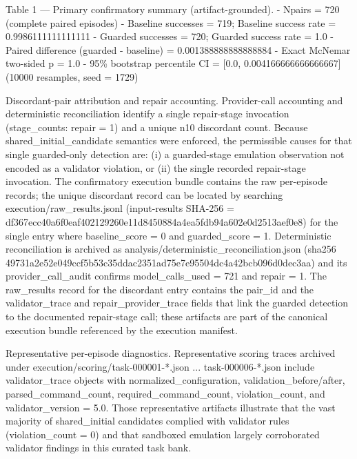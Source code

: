 \documentclass[conference]{IEEEtran}
\begin{document}
Table 1 --- Primary confirmatory summary (artifact-grounded).
- Npairs = 720 (complete paired episodes)
- Baseline successes = 719; Baseline success rate = 0.9986111111111111
- Guarded successes = 720; Guarded success rate = 1.0
- Paired difference (guarded - baseline) = 0.001388888888888884
- Exact McNemar two-sided p = 1.0
- 95\% bootstrap percentile CI = [0.0, 0.004166666666666667] (10000 resamples, seed = 1729)

Discordant-pair attribution and repair accounting. Provider-call accounting and deterministic reconciliation identify a single repair-stage invocation (stage\_counts: repair = 1) and a unique n10 discordant count. Because shared\_initial\_candidate semantics were enforced, the permissible causes for that single guarded-only detection are: (i) a guarded-stage emulation observation not encoded as a validator violation, or (ii) the single recorded repair-stage invocation. The confirmatory execution bundle contains the raw per-episode records; the unique discordant record can be located by searching execution/raw\_results.jsonl (input-results SHA-256 = df367ecc\allowbreak{}40a6f0ea\allowbreak{}f4021292\allowbreak{}60e11d84\allowbreak{}50884a4e\allowbreak{}a5fdb94a\allowbreak{}602e0d25\allowbreak{}13aef0e8) for the single entry where baseline\_score = 0 and guarded\_score = 1. Deterministic reconciliation is archived as analysis/deterministic\_reconciliation.json (sha256 49731a2e\allowbreak{}52e049cc\allowbreak{}f5b53c35\allowbreak{}ddac2351\allowbreak{}ad75e7e9\allowbreak{}5504dc4a\allowbreak{}42bcb096\allowbreak{}d0dec3aa) and its provider\_call\_audit confirms model\_calls\_used = 721 and repair = 1. The raw\_results record for the discordant entry contains the pair\_id and the validator\_trace and repair\_provider\_trace fields that link the guarded detection to the documented repair-stage call; these artifacts are part of the canonical execution bundle referenced by the execution manifest.

Representative per-episode diagnostics. Representative scoring traces archived under execution/scoring/task-000001-*.json ... task-000006-*.json include validator\_trace objects with normalized\_configuration, validation\_before/after, parsed\_command\_count, required\_command\_count, violation\_count, and validator\_version = 5.0. Those representative artifacts illustrate that the vast majority of shared\_initial candidates complied with validator rules (violation\_count = 0) and that sandboxed emulation largely corroborated validator findings in this curated task bank.
\end{document}
